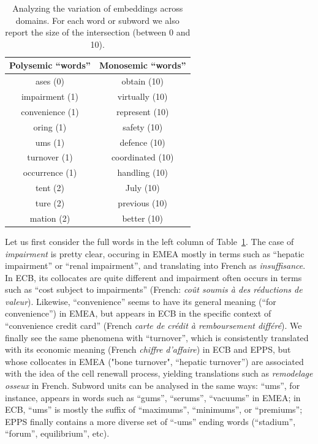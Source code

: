 \begin{table}[h]
  \centering
  \begin{tabular}{c|c}
    Polysemic ``words'' & Monosemic ``words'' \\ \hline
     ases (0) &               obtain (10) \\       
     impairment (1) &     virtually (10) \\    
     convenience (1) &    represent (10) \\    
     oring (1) &              safety (10) \\       
     ums (1) &               defence (10) \\      
     turnover (1) &         coordinated (10) \\  
     occurrence (1) &     handling (10) \\     
     tent (2) &               July (10) \\         
     ture (2) &               previous (10) \\     
     mation (2) &           better (10) \\ \hline
  \end{tabular}
  \caption{Analyzing the variation of embeddings across domains. For each word or subword we also report the size of the intersection (between 0 and 10).}
  \label{tab:embeddings}
\end{table}

Let us first consider the full words in the left column of Table~\ref{tab:embeddings}. The case of \emph{impairment} is pretty clear, occuring in EMEA mostly in terms such as ``hepatic impairment'' or ``renal impairment'', and translating into French as \textsl{insuffisance}. In ECB, its collocates are quite different and impairment often occurs in terms such as ``cost subject to impairments'' (French: \emph{co\^ut soumis \`a des r\'eductions de valeur}). Likewise, ``convenience'' seems to have its general meaning (``for convenience'') in EMEA, but appears in ECB in the specific context of ``convenience credit card'' (French \textsl{carte de cr\' edit \`a remboursement diff\'er\'e}). We finally see the same phenomena with ``turnover'', which is consistently translated with its economic meaning (French \textsl{chiffre d'affaire}) in ECB and EPPS, but whose collocates in EMEA ("bone turnover", ``hepatic turnover'') are associated with the idea of the cell renewall process, yielding translations such as \textsl{remodelage osseux} in French. Subword units can be analysed in the same ways: ``ums'', for instance, appears in words such as ``gums'', ``serums'', ``vacuums''  in EMEA; in ECB, ``ums'' is mostly the suffix of ``maximums'', ``minimums'', or ``premiums''; EPPS finally contains a more diverse set of ``-ums'' ending words (``stadium'', ``forum'', equilibrium'', etc). 

